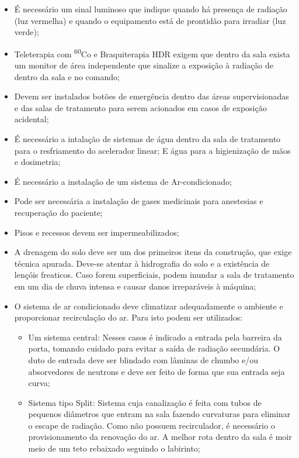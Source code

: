 \documentclass[11pt,a4paper]{article}
\begin{document}
\begin{itemize}
            \item É necessário um sinal luminoso que indique quando há presença de radiação (luz vermelha) e quando o equipamento está de prontidão para irradiar (luz verde);
            \item Teleterapia com \textsuperscript{60}Co e Braquiterapia HDR exigem que dentro da sala exista um monitor de área independente que sinalize a exposição à radiação de dentro da sala e no comando;
            \item Devem ser instalados botões de emergência dentro das áreas supervisionadas e das salas de tratamento para serem acionados em casos de exposição acidental;
            \item É necessário a intalação de sistemas de água dentro da sala de tratamento para o resfriamento do acelerador linear; E água para a higienização de mãos e dosimetria;
            \item É necessário a instalação de um sistema de Ar-condicionado;
            \item Pode ser necessária a instalação de gases medicinais para anestesias e recuperação do paciente;
            \item Pisos e recessos devem ser impermeabilizados;
            \item A drenagem do solo deve ser um dos primeiros itens da construção, que exige técnica apurada. Deve-se atentar à hidrografia do solo e a existência de lençóis freaticos. Caso forem superficiais, podem inundar a sala de tratamento em um dia de chuva intensa e causar danos irreparáveis à máquina;
            \item O sistema de ar condicionado deve climatizar adequadamente o ambiente e proporcionar recirculação do ar. Para isto podem ser utilizados:
                \begin{itemize}
                    \item Um sistema central: Nesses casos é indicado a entrada pela barreira da porta, tomando cuidado para evitar a saída de radiação secundária. O duto de entrada deve ser blindado com lâminas de chumbo e/ou absorvedores de neutrons e deve ser feito de forma que sua entrada seja curva;
                    \item Sistema tipo Split: Sistema cuja canalização é feita com tubos de pequenos diâmetros que entram na sala fazendo curvaturas para eliminar o escape de radiação. Como não possuem recirculador, é necessário o provisionamento da renovação do ar. A melhor rota dentro da sala é moir meio de um teto rebaixado seguindo o labirinto;
                    


\end{itemize}
\end{itemize}
\end{document}
